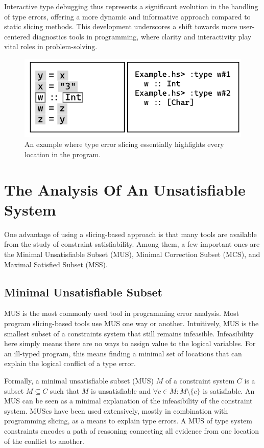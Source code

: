 Interactive type debugging thus represents a significant evolution in the handling of type errors, offering a more dynamic and informative approach compared to static slicing methods. This development underscores a shift towards more user-centered diagnostics tools in programming, where clarity and interactivity play vital roles in problem-solving.

\begin{figure}[hbt]
  \includegraphics[width=0.8\linewidth]{ChameleonInteractive}
  \caption{
    \label{fig:chameleon-interactive}
      An example where type error slicing essentially highlights every location in the program.}
\end{figure}

\section{The Analysis Of An Unsatisfiable System}

One advantage of using a slicing-based approach is that many tools are available from the study of constraint satisfiability. Among them, a few important ones are the Minimal Unsatisfiable Subset (MUS), Minimal Correction Subset (MCS), and Maximal Satisfied Subset (MSS).  

\subsection{Minimal Unsatisfiable Subset}

MUS is the most commonly used tool in programming error analysis. Most program slicing-based tools \cite{Haack2004-fr, Pavlinovic2015-ke, Stuckey2003-pz} use MUS one way or another. Intuitively, MUS is the smallest subset of a constraints system that still remains infeasible. Infeasibility here simply means there are no ways to assign value to the logical variables. For an ill-typed program, this means finding a minimal set of locations that can explain the logical conflict of a type error. 

Formally,  a minimal unsatisfiable subset (MUS) $M$ of a constraint system $C$ is a subset $M \subseteq C$ such that $M$ is unsatisfiable and $ \forall{c} \in M : M \setminus \{c\}$ is satisfiable. An MUS can be seen as a minimal explanation of the infeasibility of the constraint system. MUSes have been used extensively, mostly in combination with programming slicing, as a means to explain type errors. A MUS of type system constraints encodes a path of reasoning connecting all evidence from one location of the conflict to another.


